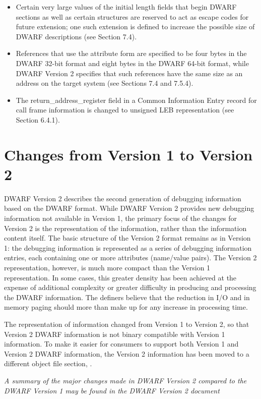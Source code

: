 \begin{itemize}
\item
Certain very large values of the initial length fields that
begin DWARF sections as well as certain structures are reserved
to act as escape codes for future extension; one such extension
is defined to increase the possible size of DWARF descriptions
(see Section 7.4).

\item
References that use the attribute form 
are specified to be four bytes in the DWARF 32-bit format and
eight bytes in the DWARF 64-bit format, while DWARF Version
2 specifies that such references have the same size as an
address on the target system (see Sections 7.4 and 7.5.4).

\item
The return\_address\_register field in a Common Information
Entry record for call frame information is changed to unsigned
LEB representation (see Section 6.4.1).

\end{itemize}


\section[Changes Version1 to 2]{Changes from Version 1 to Version 2}
DWARF Version 2 describes the second generation of debugging
information based on the DWARF format. While DWARF Version
2 provides new debugging information not available in
Version 1, the primary focus of the changes for Version
2 is the representation of the information, rather than
the information content itself. The basic structure of
the Version 2 format remains as in Version 1: the debugging
information is represented as a series of debugging information
entries, each containing one or more attributes (name/value
pairs). The Version 2 representation, however, is much more
compact than the Version 1 representation. In some cases,
this greater density has been achieved at the expense of
additional complexity or greater difficulty in producing and
processing the DWARF information. The definers believe that the
reduction in I/O and in memory paging should more than make
up for any increase in processing time.  

The representation
of information changed from Version 1 to Version 2, so that
Version 2 DWARF information is not binary compatible with
Version 1 information. To make it easier for consumers to
support both Version 1 and Version 2 DWARF information, the
Version 2 information has been moved to a different object
file section, .  

\textit{
A summary of the major changes
made in DWARF Version 2 compared to the DWARF Version 1 may
be found in the DWARF Version 2 document
}

